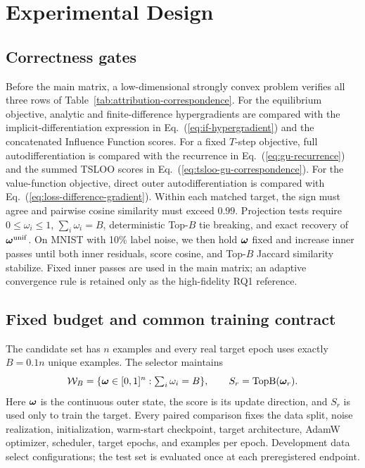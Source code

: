 \section{Experimental Design}
\label{sec:experiments}

\subsection{Correctness gates}

Before the main matrix, a low-dimensional strongly convex problem verifies all
three rows of Table~\ref{tab:attribution-correspondence}. For the equilibrium
objective, analytic and finite-difference hypergradients are compared with the
implicit-differentiation expression in Eq.~(\ref{eq:if-hypergradient}) and the
concatenated Influence Function scores. For a fixed $T$-step objective, full
autodifferentiation is compared with the recurrence in
Eq.~(\ref{eq:gu-recurrence}) and the summed TSLOO scores in
Eq.~(\ref{eq:tsloo-gu-correspondence}). For the value-function objective, direct
outer autodifferentiation is compared with
Eq.~(\ref{eq:loss-difference-gradient}). Within each matched target, the sign
must agree and pairwise cosine similarity must exceed $0.99$. Projection tests require
$0\leq\omega_i\leq1$, $\sum_i\omega_i=B$, deterministic Top-$B$ tie breaking,
and exact recovery of ${\bm{\omega}}^{\mathrm{unif}}$. On MNIST with 10\% label
noise, we then hold ${\bm{\omega}}$ fixed and increase inner passes until both inner
residuals, score cosine, and Top-$B$ Jaccard similarity stabilize. Fixed inner
passes are used in the main matrix; an adaptive convergence rule is retained
only as the high-fidelity RQ1 reference.

\subsection{Fixed budget and common training contract}

The candidate set has $n$ examples and every real target epoch uses exactly
$B=0.1n$ unique examples. The selector maintains
\begin{equation}
\mathcal{W}_{B}=\{{\bm{\omega}}\in[0,1]^n:\textstyle\sum_i\omega_i=B\},
\qquad S_r=\operatorname{TopB}({\bm{\omega}}_r).
\end{equation}
Here ${\bm{\omega}}$ is the continuous outer state, the score is its update
direction, and $S_r$ is used only to train the target. Every paired comparison
fixes the data split, noise realization, initialization, warm-start checkpoint,
target architecture, AdamW optimizer, scheduler, target epochs, and examples
per epoch. Development data select configurations; the test set is evaluated
once at each preregistered endpoint.

